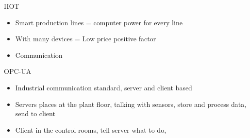 \begin{block}{IIOT}
    \begin{itemize}
        \item Smart production lines = computer power for every line
        \item With many devices = Low price positive factor
        \item Communication
    \end{itemize}
\end{block}

\begin{block}{OPC-UA}
   \begin{itemize}
       \item Industrial communication standard, server and client based
       \item Servers places at the plant floor, talking with sensors, store and process data, send to client
       \item Client in the control rooms, tell server what to do, 
   \end{itemize}
\end{block}